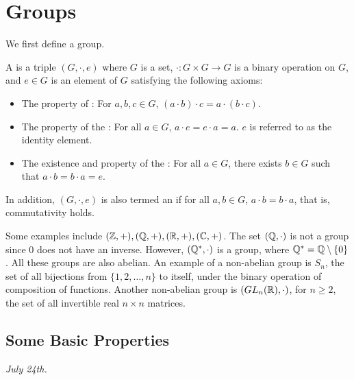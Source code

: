 \section{Groups}
We first define a group.
\begin{definition}
    A  is a triple $(G, \cdot, e)$ where $G$ is a set, $\cdot: G \times G \to G$ is a binary operation on $G$, and $e \in G$ is an element of $G$ satisfying the following axioms:
    \begin{itemize}
        \item The property of : For $a,b,c \in G$, $(a \cdot b) \cdot c = a \cdot (b \cdot c)$.
        \item The property of the : For all $a \in G$, $a \cdot e = e \cdot a = a$. $e$ is referred to as the identity element.
        \item The existence and property of the : For all $a \in G$, there exists $b \in G$ such that $a \cdot b = b \cdot a = e$.
    \end{itemize}
    In addition, $(G,\cdot,e)$ is also termed an  if for all $a,b \in G$, $a \cdot b = b \cdot a$, that is, commutativity holds.
\end{definition}
Some examples include $(\mathbb{Z}, +), (\mathbb{Q}, +), (\mathbb{R}, +), (\mathbb{C}, +)$. The set $(\mathbb{Q}, \cdot)$ is not a group since $0$ does not have an inverse. However, $(\mathbb{Q}^{\ast}, \cdot)$ is a group, where $\mathbb{Q}^{\ast} = \mathbb{Q}\setminus\{0\}$. All these groups are also abelian. An example of a non-abelian group is $S_{n}$, the set of all bijections from $\{1,2,\ldots,n\}$ to itself, under the binary operation of composition of functions. Another non-abelian group is $(GL_{n}(\mathbb{R}), \cdot)$, for $n \geq 2$, the set of all invertible real $n \times n$ matrices.

\subsection{Some Basic Properties}
\textit{July 24th.}


